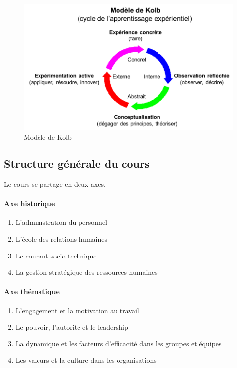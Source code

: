 \documentclass[12pt]{article}
\begin{document}
  \begin{figure}[h]
  	\begin{center}
  	\includegraphics[scale=0.6]{modele_kolb.png}
  	\caption{Modèle de Kolb}
  	\label{modele_kolb}
  	\end{center}
  \end{figure}
  
  \subsection{Structure générale du cours}
    Le cours se partage en deux axes.
    
    \paragraph{Axe historique}
      \begin{enumerate}
       \item L'administration du personnel
       \item L'école des relations humaines
       \item Le courant socio-technique
       \item La gestion stratégique des ressources humaines
      \end{enumerate}
    
    \paragraph{Axe thématique}
      \begin{enumerate}
       \item L'engagement et la motivation au travail
       \item Le pouvoir, l'autorité et le leadership
       \item La dynamique et les facteurs d'efficacité dans les groupes et équipes
       \item Les valeurs et la culture dans les organisations
      \end{enumerate}
\end{document}
